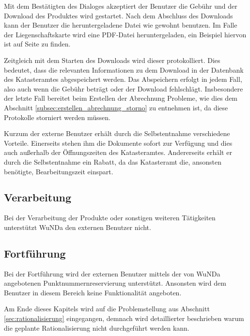Mit dem Bestätigten des Dialoges akzeptiert der Benutzer die Gebühr und der Download des Produktes wird gestartet. Nach dem Abschluss des Downloads kann der Benutzer die heruntergeladene Datei wie gewohnt benutzen. Im Falle der Liegenschaftskarte wird eine PDF-Datei heruntergeladen, ein Beispiel hiervon ist auf Seite \pageref{fig:flurkarte} zu finden.

\label{subsec:beschaffung-download}
Zeitgleich mit dem Starten des Downloads wird dieser protokolliert. Dies bedeutet, dass die relevanten Informationen zu dem Download in der Datenbank des Katasteramtes abgespeichert werden. Das Abspeichern erfolgt in jedem Fall, also auch wenn die Gebühr  beträgt oder der Download fehlschlägt. Insbesondere der letzte Fall bereitet beim Erstellen der Abrechnung Probleme, wie dies dem Abschnitt \vref{subsec:erstellen_abrechnung_storno} zu entnehmen ist, da diese Protokolle storniert werden müssen.
 
Kurzum der externe Benutzer erhält durch die Selbstentnahme verschiedene Vorteile.
Einerseits stehen ihm die Dokumente sofort zur Verfügung und dies auch außerhalb der Öffnungszeiten des Katasteramtes.
Andererseits erhält er durch die Selbstentnahme ein Rabatt, da das Katasteramt die, ansonsten benötigte, Bearbeitungszeit einspart.

\subsection{Verarbeitung}
Bei der Verarbeitung der Produkte oder sonstigen weiteren Tätigkeiten unterstützt \ac{WuNDa} den externen Benutzer nicht.

\subsection{Fortführung}
Bei der Fortführung wird der externen Benutzer mittels der von \ac{WuNDa} angebotenen Punktnummernreservierung unterstützt.
Ansonsten wird dem Benutzer in diesem Bereich keine Funktionalität angeboten.

\bigskip
Am Ende dieses Kapitels wird auf die Problemstellung aus Abschnitt \ref{sec:rationalisierung} eingegangen, demnach wird detaillierter beschrieben warum die geplante Rationalisierung nicht durchgeführt werden kann.


